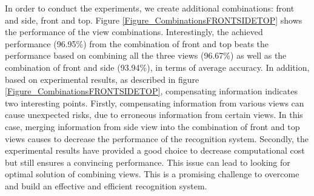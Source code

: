 \documentclass[final,3p,times,twocolumn]{elsarticle}
\begin{document}
In order to conduct the experiments, we create additional combinations: front and side, front and top.
Figure \ref{Figure_CombinationsFRONTSIDETOP} shows the performance of the view combinations.
Interestingly, the achieved performance (96.95\%) from the combination of front and top beats the performance based on combining all the three views (96.67\%) as well as the combination of front and side (93.94\%), in terms of average accuracy.
In addition, based on experimental results, as described in figure \ref{Figure_CombinationsFRONTSIDETOP}, compensating information indicates two interesting points.
Firstly, compensating information from various views can cause unexpected risks, due to erroneous information from certain views.
In this case, merging information from side view into the combination of front and top views causes to decrease the performance of the recognition system.
Secondly, the experimental results have provided a good choice to decrease computational cost but still ensures a convincing performance.
This issue can lead to looking for optimal solution of combining views.
This is a promising challenge to overcome and build an effective and efficient recognition system.
\end{document}
